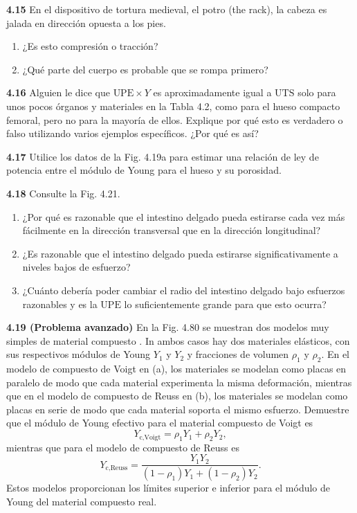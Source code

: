 \documentclass[12pt]{book}
\begin{document}
\textbf{4.15} En el dispositivo de tortura medieval, el potro (the rack), la cabeza es jalada en dirección opuesta a los pies.
\begin{enumerate}
  \item[(a)] ¿Es esto compresión o tracción?
  \item[(b)] ¿Qué parte del cuerpo es probable que se rompa primero?
\end{enumerate}

\textbf{4.16} Alguien le dice que $\text{UPE} \times Y$ es aproximadamente igual a $\text{UTS}$ solo para unos pocos órganos y materiales en la Tabla 4.2, como para el hueso compacto femoral, pero no para la mayoría de ellos. Explique por qué esto es verdadero o falso utilizando varios ejemplos específicos. ¿Por qué es así?

\textbf{4.17} Utilice los datos de la Fig. 4.19a para estimar una relación de ley de potencia entre el módulo de Young para el hueso y su porosidad.

\textbf{4.18} Consulte la Fig. 4.21.
\begin{enumerate}
  \item[(a)] ¿Por qué es razonable que el intestino delgado pueda estirarse cada vez más fácilmente en la dirección transversal que en la dirección longitudinal?
  \item[(b)] ¿Es razonable que el intestino delgado pueda estirarse significativamente a niveles bajos de esfuerzo?
  \item[(c)] ¿Cuánto debería poder cambiar el radio del intestino delgado bajo esfuerzos razonables y es la $\text{UPE}$ lo suficientemente grande para que esto ocurra?
\end{enumerate}

\textbf{4.19 (Problema avanzado)} En la Fig. 4.80 se muestran dos modelos muy simples de material compuesto \cite{45}. In ambos casos hay dos materiales elásticos, con sus respectivos módulos de Young $Y_1$ y $Y_2$ y fracciones de volumen $\rho_1$ y $\rho_2$. En el modelo de compuesto de Voigt en (a), los materiales se modelan como placas en paralelo de modo que cada material experimenta la misma deformación, mientras que en el modelo de compuesto de Reuss en (b), los materiales se modelan como placas en serie de modo que cada material soporta el mismo esfuerzo. Demuestre que el módulo de Young efectivo para el material compuesto de Voigt es
\begin{equation}
Y_{\text{c,Voigt}} = \rho_1 Y_1 + \rho_2 Y_2,
\label{eq:4.98}
\end{equation}
mientras que para el modelo de compuesto de Reuss es
\begin{equation}
Y_{\text{c,Reuss}} = \frac{Y_1 Y_2}{(1 - \rho_1)Y_1 + (1 - \rho_2)Y_2}.
\label{eq:4.99}
\end{equation}
Estos modelos proporcionan los límites superior e inferior para el módulo de Young del material compuesto real.
\end{document}
